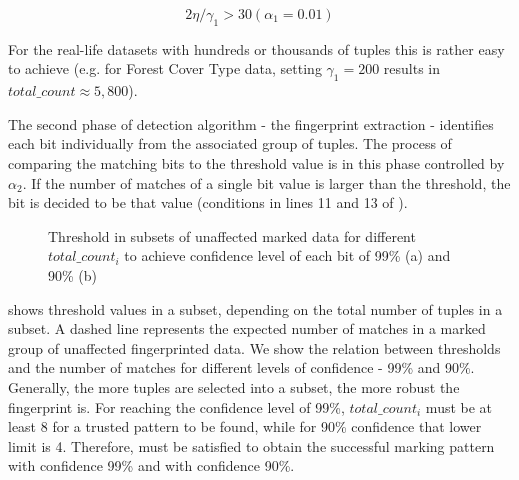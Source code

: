 \begin{equation}\label{eq:ownership-verification}
    2\eta/\gamma_1 > 30 (\alpha_1=0.01)
\end{equation}

For the real-life datasets with hundreds or thousands of tuples this is rather easy to achieve (e.g. for Forest Cover Type data, setting $\gamma_1=200$ results in $total\_count \approx 5,800$).

The second phase of detection algorithm - the fingerprint extraction - identifies each bit individually from the associated group of tuples. 
The process of comparing the matching bits to the threshold value is in this phase controlled by $\alpha_2$.
If the number of matches of a single bit value is larger than the threshold, the bit is decided to be that value (conditions in lines 11 and 13 of ).

\begin{figure}
\centering
    \qquad
    \caption{Threshold in subsets of unaffected marked data for different $total\_count_i$ to achieve confidence level of each bit of 99\% (a) and 90\% (b)}
    \label{fig:threshold-fingerprint-extraction}
\end{figure}

 shows threshold values in a subset, depending on the total number of tuples in a subset. 
A dashed line represents the expected number of matches in a marked group of unaffected fingerprinted data.
We show the relation between thresholds and the number of matches for different levels of confidence - 99\% and 90\%.
Generally, the more tuples are selected into a subset, the more robust the fingerprint is. 
For reaching the confidence level of 99\%, $total\_count_i$  must be at least 8 for a trusted pattern to be found, while for 90\% confidence that lower limit is 4. 
Therefore,  must be satisfied to obtain the successful marking pattern with confidence 99\% and  with confidence 90\%.

